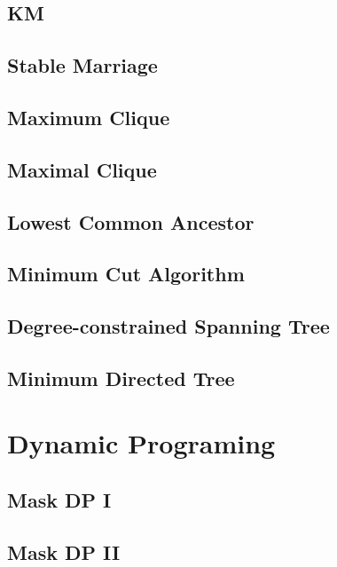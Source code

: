 \documentclass[a4paper,5pt,twocolumn,titlepage]{article}
\begin{document}
\begin{CJK*}{GBK}{song}
\subsection{KM}

\subsection{Stable Marriage}

\subsection{Maximum Clique}

\subsection{Maximal Clique}

\subsection{Lowest Common Ancestor}

\subsection{Minimum Cut Algorithm}

\subsection{Degree-constrained Spanning Tree}

\subsection{Minimum Directed Tree}

\section{Dynamic Programing}
\subsection{Mask DP I}

\subsection{Mask DP II}


\end{CJK*}
\end{document}
